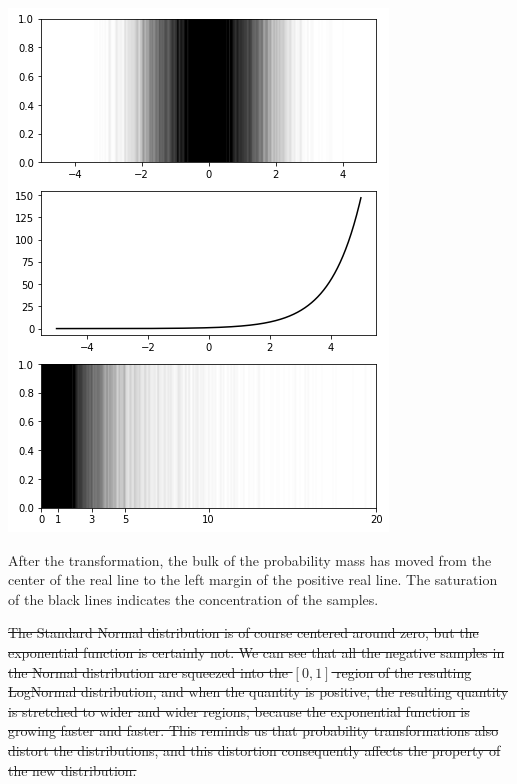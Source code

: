 \documentclass[11pt]{article}
\begin{document}
\begin{center}
\includegraphics[width=.9\linewidth]{./.ob-jupyter/c59ca9a255316f2f2fb5d2e4cdb6f0a077d97699.png}
\end{center}

After the transformation, the bulk of the probability mass has moved from the center of the real line to the left margin of the positive real line. The saturation of the black lines indicates the concentration of the samples.

\sout{The Standard Normal distribution is of course centered around zero, but the exponential function is certainly not. We can see that all the negative samples in the Normal distribution are squeezed into the \([0, 1]\) region of the resulting LogNormal distribution, and when the quantity is positive, the resulting quantity is stretched to wider and wider regions, because the exponential function is growing faster and faster. This reminds us that probability transformations also distort the distributions, and this distortion consequently affects the property of the new distribution.}
\end{document}
